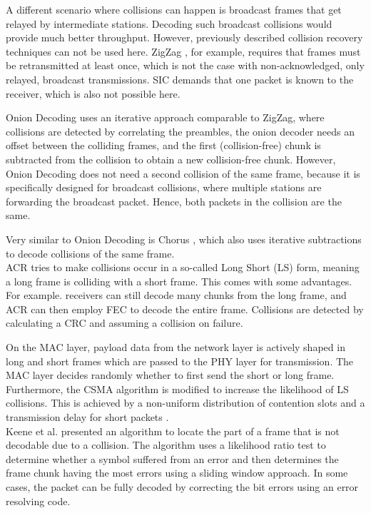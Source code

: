 A different scenario where collisions can happen is broadcast frames that get relayed by intermediate stations. Decoding  such broadcast collisions would provide much better throughput. However, previously described collision recovery techniques can not be used here. ZigZag \cite{gollakota2008}, for example, requires that frames must be retransmitted at least once, which is not the case with non-acknowledged, only relayed, broadcast transmissions. \gls{SIC} \cite{patel1994} demands that one packet is known to the receiver, which is also not possible here.

Onion Decoding \cite{wang2010} uses an iterative approach  comparable to ZigZag, where collisions are detected by correlating the preambles, the onion decoder needs an offset between the colliding frames, and the first (collision-free) chunk is subtracted from the collision to obtain a new collision-free chunk. However, Onion Decoding does not need a second collision of the same frame, because it is specifically designed for broadcast collisions, where multiple stations are forwarding the broadcast packet. Hence, both packets in the collision are the same.

Very similar to Onion Decoding is Chorus \cite{zhang2010}, which also uses iterative subtractions to decode collisions of the same frame.\\

\gls{ACR} \cite{wu2010} tries to make collisions occur in a so-called Long Short (LS) form, meaning a long frame is colliding with a short frame. This comes with some advantages. For example. receivers can still decode many chunks from the long frame, and \gls{ACR} can then employ \gls{FEC} to decode the entire frame. Collisions are detected by calculating a \gls{CRC} and assuming a collision on failure.

On the MAC layer, payload data from the network layer is actively shaped in long and short frames which are passed to the PHY layer for transmission. The MAC layer decides randomly whether to first send the short or long frame. Furthermore, the \gls{CSMA} algorithm is modified to increase the likelihood of LS collisions. This is achieved by a non-uniform distribution of contention slots and a transmission delay for short packets \cite{wu2010}.\\

Keene et al. \cite{keene2010} presented an algorithm to locate the part of a frame that is not decodable due to a collision. The algorithm uses a likelihood ratio test to determine whether a symbol suffered from an error and then determines the frame chunk having the most errors using a sliding window approach. In some cases, the packet can be fully decoded by correcting the bit errors using an error resolving code.


